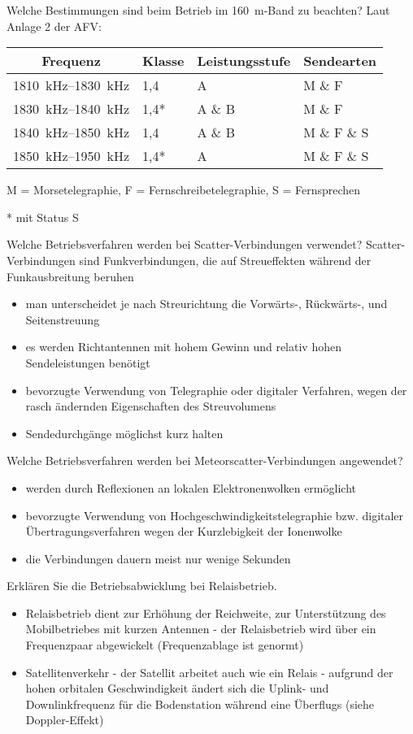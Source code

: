 \documentclass[avery5371,grid,frame,a4paper]{flashcards}
\newcommand{\card}[3]{
  \begin{flashcard}[{\chap} -- #1]{#2}#3\end{flashcard}
}
\begin{document}
\card{56}{Welche Bestimmungen sind beim Betrieb im \SI{160}{\metre}-Band zu beachten?}{
  Laut Anlage 2 der AFV:

  \footnotesize
  \vspace{10pt}
  \begin{tabular}{clll}
    Frequenz             & Klasse & Leistungsstufe & Sendearten \\
  \hline
    \SIrange{1810}{1830}{\kilo\Hz} & 1,4  & A      & M \& F \\
    \SIrange{1830}{1840}{\kilo\Hz} & 1,4* & A \& B & M \& F \\
    \SIrange{1840}{1850}{\kilo\Hz} & 1,4  & A \& B & M \& F \& S \\
    \SIrange{1850}{1950}{\kilo\Hz} & 1,4* & A      & M \& F \& S \\
  \end{tabular}
  \vspace{10pt}

  M = Morsetelegraphie, F = Fernschreibetelegraphie, S = Fernsprechen

  * \quad mit Status S
}
\card{57}{Welche Betriebsverfahren werden bei Scatter-Verbindungen verwendet?}{
  \small
  Scatter-Verbindungen sind Funkverbindungen, die auf Streueffekten während der Funkausbreitung beruhen
  \begin{itemize}
    \item man unterscheidet je nach Streurichtung die Vorwärts-, Rückwärts-, und Seitenstreuung
    \item es werden Richtantennen mit hohem Gewinn und relativ hohen Sendeleistungen benötigt
    \item bevorzugte Verwendung von Telegraphie oder digitaler Verfahren, wegen der rasch ändernden Eigenschaften des Streuvolumens
    \item Sendedurchgänge möglichst kurz halten
  \end{itemize}
}
\card{58}{Welche Betriebsverfahren werden bei Meteorscatter-Verbindungen angewendet?}{
  \begin{itemize}
    \item werden durch Reflexionen an lokalen Elektronenwolken ermöglicht
    \item bevorzugte Verwendung von Hochgeschwindigkeitstelegraphie bzw. digitaler Übertragungsverfahren wegen der Kurzlebigkeit der Ionenwolke
    \item die Verbindungen dauern meist nur wenige Sekunden
  \end{itemize}
}
\card{59}{Erklären Sie die Betriebsabwicklung bei Relaisbetrieb.}{
  \begin{itemize}
    \item Relaisbetrieb dient zur Erhöhung der Reichweite, zur Unterstützung des Mobilbetriebes mit kurzen Antennen - der Relaisbetrieb wird über ein Frequenzpaar abgewickelt (Frequenzablage ist genormt)

    \item Satellitenverkehr - der Satellit arbeitet auch wie ein Relais - aufgrund der hohen orbitalen Geschwindigkeit ändert sich die Uplink- und Downlinkfrequenz für die Bodenstation während eine Überflugs (siehe Doppler-Effekt)
  \end{itemize}
}
\end{document}
